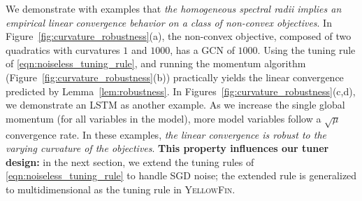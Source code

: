 \documentclass{article} %
\newcommand{\mat}[1]{\bm{\mathit{#1}}}
\newcommand{\tuner}{\textsc{YellowFin}\xspace}
\begin{document}
We demonstrate with examples that \emph{the homogeneous spectral radii implies an empirical linear convergence behavior on a class of non-convex objectives}. In Figure~\ref{fig:curvature_robustness}(a), the non-convex objective,
composed of two quadratics with curvatures $1$ and $1000$, has a GCN of $1000$.
Using the tuning rule of \eqref{eqn:noiseless_tuning_rule}, and running the momentum algorithm (Figure~\ref{fig:curvature_robustness}(b)) practically yields the linear convergence predicted by Lemma~\ref{lem:robustness}.
In Figures~\ref{fig:curvature_robustness}(c,d), we demonstrate an LSTM as another example. As we increase the single global momentum (for all variables in the model), more model variables follow a $\sqrt{\mu}$ convergence rate.
In these examples, \emph{the linear convergence is robust to the varying curvature of the objectives}. \textbf{This property influences our tuner design:}
{in the next section, we extend the tuning rules of \eqref{eqn:noiseless_tuning_rule} to handle SGD noise; 
the extended rule is generalized to multidimensional as the tuning rule in \tuner}.
\end{document}
